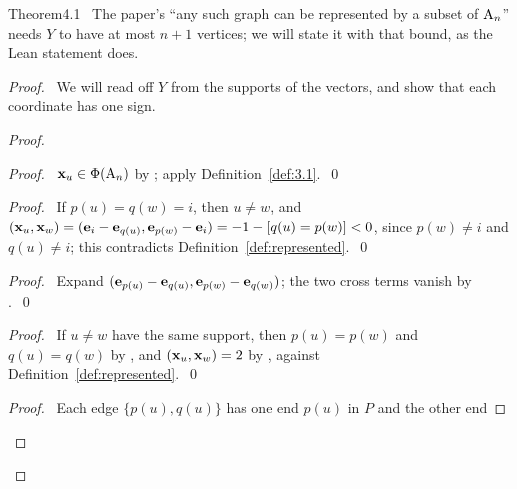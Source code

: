 \begin{cgss}{Theorem}{4.1}\label{thm:4.1}
 \new\ The paper's ``any such graph can be represented by a subset of $\mathrm{A}_n$'' needs $Y$ to
 have at most $n+1$ vertices; we will state it with that bound, as the Lean statement does.
\end{cgss}
\begin{proof}
 \pfsketch\ We will read off $Y$ from the supports of the vectors, and show that each coordinate
 has one sign.
 \begin{proof}
  \begin{proof}\pf\ ${\mathbf x}_u\in\Phi(\mathrm{A}_n)$ by ; apply
   Definition~\ref{def:3.1}.~\qed\end{proof}
  \begin{proof}\pf\ If $p(u)=q(w)=i$, then $u\ne w$, and
   $({\mathbf x}_u,{\mathbf x}_w)=({\mathbf e}_i-{\mathbf e}_{q(u)},{\mathbf e}_{p(w)}-{\mathbf e}_i)=-1-[q(u)=p(w)]<0$, since $p(w)\ne i$ and
   $q(u)\ne i$; this contradicts Definition~\ref{def:represented}.~\qed\end{proof}
  \begin{proof}\pf\ Expand $({\mathbf e}_{p(u)}-{\mathbf e}_{q(u)},{\mathbf e}_{p(w)}-{\mathbf e}_{q(w)})$; the two cross terms
   vanish by .~\qed\end{proof}
  \begin{proof}\pf\ If $u\ne w$ have the same support, then $p(u)=p(w)$ and $q(u)=q(w)$ by
   , and $({\mathbf x}_u,{\mathbf x}_w)=2$ by , against
   Definition~\ref{def:represented}.~\qed\end{proof}
  \begin{proof}\pf\ Each edge $\{p(u),q(u)\}$ has one end $p(u)$ in $P$ and the other end

\end{proof}
\end{proof}
\end{proof}
